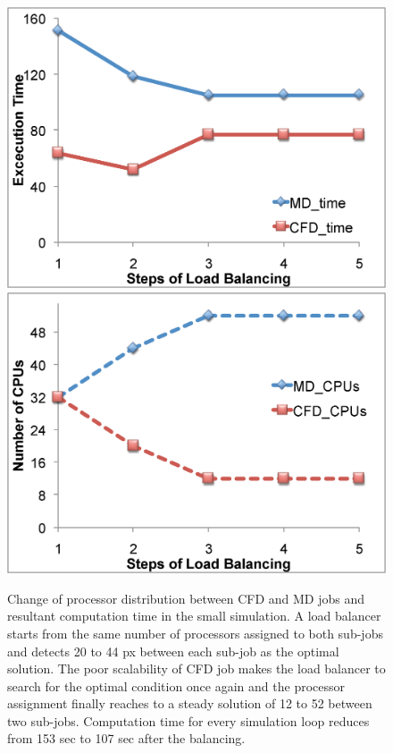 \documentclass[conference,final]{IEEEtran}
\begin{document}
\begin{figure}
\centering
\includegraphics[scale=0.3]{fig6_1.eps}
\linebreak
\includegraphics[scale=0.3]{fig6_2.eps}
\caption{\small Change of processor distribution between CFD and MD
  jobs and resultant computation time in the small simulation. A load
  balancer starts from the same number of processors assigned to both
  sub-jobs and detects 20 to 44 px between each sub-job as the optimal
  solution. The poor scalability of CFD job makes the load balancer to
  search for the optimal condition once again and the processor
  assignment finally reaches to a steady solution of 12 to 52 between
  two sub-jobs. Computation time for every simulation loop reduces
  from 153 sec to 107 sec after the balancing.}
\label{Fig:LBSmall}
\vspace{-1em}
\end{figure}
\end{document}
